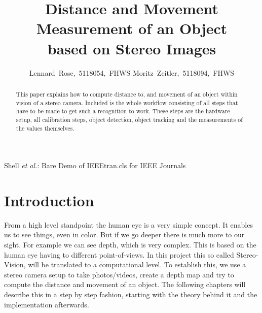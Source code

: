\documentclass[journal,onecolumn]{IEEEtran}
\begin{document}
	\title{Distance and Movement Measurement of an Object\\ based on Stereo Images}

	\author{Lennard~Rose,~5118054,~FHWS
		Moritz~Zeitler,~5118094,~FHWS%
	}
	{Shell \MakeLowercase{\textit{et al.}}: Bare Demo of IEEEtran.cls for IEEE Journals}

	\maketitle

	\begin{abstract}
		\noindent
		This paper explains how to compute distance to, and movement of an object within vision of a stereo camera.
		Included is the whole workflow consisting of all steps that have to be made to get such a recognition to work. These steps are the hardware setup, all calibration steps, object detection, object tracking and the measurements of the values themselves.
	\end{abstract}


	\IEEEpeerreviewmaketitle

	\section{Introduction}
\label{sec:einfuehrung}
\noindent
From a high level standpoint the human eye is a very simple concept. It enables us to see things, even in color. But if we go deeper there is much more to our sight. For example we can see depth, which is very complex. This is based on the human eye having to different point-of-views. In this project this so called Stereo-Vision, will be translated to a computational level. To establish this, we use a stereo camera setup to take photos/videos, create a depth map and try to compute the distance and movement of an object. The following chapters will describe this in a step by step fashion, starting with the theory behind it and the implementation afterwards.
\end{document}
